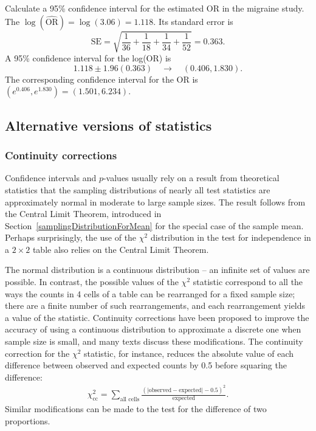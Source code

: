 \begin{examplewrap}
\begin{nexample}{Calculate a 95\% confidence interval for the estimated OR in the migraine study.}
The $\log(\widehat{\text{OR}}) = \log(3.06) = 1.118$.   Its standard error is
    \[
      \text{SE} = \sqrt{\frac{1}{36} + \frac{1}{18}
   + \frac{1}{34} + \frac{1}{52}} = 0.363.
 \]
A 95\% confidence interval for the log(OR) is
\[
      1.118 \pm 1.96(0.363) \quad \to \quad (0.406, 1.830).
\]
The corresponding confidence interval for the OR is $(e^{0.406}, e^{1.830}) = (1.501, 6.234).$
\end{nexample}
\end{examplewrap}

\subsection{Alternative versions of statistics}
\label{alternativeTestStatisticsBinaryData}

\subsubsection{Continuity corrections}

Confidence intervals and $p$-values usually rely on a result from theoretical statistics that the sampling distributions of nearly all test statistics are approximately normal in moderate to large sample sizes.  The result follows from the Central Limit Theorem, introduced in Section~\ref{samplingDistributionForMean} for the special case of the sample mean. Perhaps surprisingly, the use of the $\chi^2$  distribution in the test for independence in a $2 \times 2$ table also relies on the Central Limit Theorem.

The normal distribution is a continuous distribution -- an infinite set of values are possible. In contrast, the possible values of the $\chi^2$ statistic correspond to all the ways the counts in 4 cells of a table can be rearranged for a fixed sample size; there are a finite number of such rearrangements, and each rearrangement yields a value of the statistic. Continuity corrections have been proposed to improve the accuracy of using a continuous distribution to approximate a discrete one when sample size is small, and many texts discuss these modifications. The continuity correction for the $\chi^2$ statistic, for instance, reduces the absolute value of each difference between observed and expected counts by 0.5 before squaring the difference:
\begin{align}
  \chi^2_{\text{cc}} = \sum_{\text{all cells}} \frac{(|\text{observed} - \text{expected}| - 0.5)^2}{\text{expected}}. \label{eqn:fisherYatesTest}
\end{align}
Similar modifications can be made to the test for the difference of two proportions.

